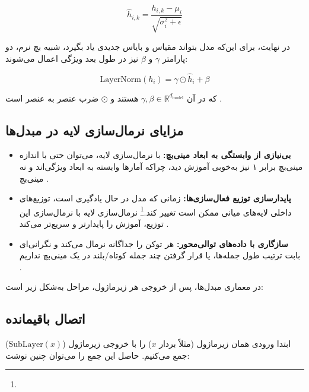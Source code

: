\begin{equation}
	\hat{h}_{i,k} = \frac{h_{i,k} - \mu_i}{\sqrt{\sigma_i^2 + \epsilon}}
	\label{eq:normalized_h}
\end{equation}

در نهایت، برای این‌که مدل بتواند مقیاس و بایاس جدیدی یاد بگیرد، شبیه بچ نرم، دو پارامتر \( \gamma \) و \( \beta \) نیز در طول بعد ویژگی اعمال می‌شوند:

\begin{equation}
	\text{LayerNorm}(h_i) = \gamma \odot \hat{h}_i + \beta
	\label{eq:layernorm}
\end{equation}

که در آن \( \gamma, \beta \in \mathbb{R}^{d_{\text{model}}} \) هستند و \( \odot \) ضرب عنصر به عنصر است \cite{ba2016layer}.

\subsection*{مزایای نرمال‌سازی لایه در مبدل‌ها}

\begin{itemize}
	\item \textbf{بی‌نیازی از وابستگی به ابعاد مینی‌بچ:}
	با نرمال‌سازی لایه، می‌توان حتی با اندازه مینی‌بچ برابر ۱ نیز به‌خوبی آموزش دید، چراکه آمارها وابسته به ابعاد ویژگی‌اند و نه مینی‌بچ \cite{ba2016layer}.
	
	\item \textbf{پایدارسازی توزیع فعال‌سازی‌ها:}
	زمانی که مدل در حال یادگیری است، توزیع‌های داخلی لایه‌های میانی ممکن است تغییر کند.\footnote{} نرمال‌سازی لایه با نرمال‌سازی این توزیع، آموزش را پایدارتر و سریع‌تر می‌کند \cite{ioffe2015batch,ba2016layer}.
	
	\item \textbf{سازگاری با داده‌های توالی‌محور:}
	هر توکن را جداگانه نرمال می‌کند و نگرانی‌ای بابت ترتیب طول جمله‌ها، یا قرار گرفتن چند جمله کوتاه/بلند در یک مینی‌بچ نداریم \cite{vaswani2017attention}.
\end{itemize}

در معماری مبدل‌ها، پس از خروجی هر زیرماژول، مراحل به‌شکل زیر است:

\subsection{اتصال باقیمانده}
ابتدا ورودی همان زیرماژول (مثلاً بردار \( x \)) را با خروجی زیرماژول (\( \text{SubLayer}(x) \)) جمع می‌کنیم. حاصل این جمع را می‌توان چنین نوشت:

